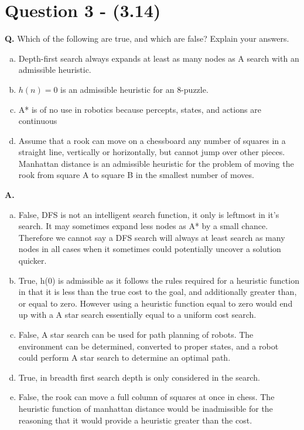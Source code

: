 \documentclass[12pt]{amsart}
\begin{document}
\section*{Question 3 - (3.14)}
\textbf{Q.} Which of the following are true, and which are false? Explain your answers.

\begin{enumerate}[a)]
  \item Depth-first search always expands at least as many nodes as A search with an admissible heuristic.
   \item $h(n) = 0 $ is an admissible heuristic for an 8-puzzle.
   \item A* is of no use in robotics because percepts, states, and actions are continuous
    \item Assume that a rook can move on a chessboard any number of squares in a straight line, vertically or horizontally, but cannot jump over other pieces. Manhattan distance is an admissible heuristic for the problem of moving the rook from square A to square B in the smallest number of moves.
\end{enumerate} \hfill \break

\textbf{A.}

\begin{enumerate}[a)]
\item False, DFS is not an intelligent search function, it only is leftmost in it's search. It may sometimes expand less nodes as A* by a small chance. Therefore we cannot say a DFS search will always at least search as many nodes in all cases when it sometimes could potentially uncover a solution quicker.
\item True, h(0) is admissible as it follows the rules required for a heuristic function in that it is less than the true cost to the goal, and additionally greater than, or equal to zero. However using a heuristic function equal to zero would end up with a A star search essentially equal to a uniform cost search.
\item False, A star search can be used for path planning of robots. The environment can be determined, converted to proper states, and a robot could perform A star search to determine an optimal path. 
\item True, in breadth first search depth is only considered in the search. 
\item False, the rook can move a full column of squares at once in chess. The heuristic function of manhattan distance would be inadmissible for the reasoning that it would provide a heuristic greater than the cost. 
\end{enumerate} \hfill \break
   
\end{document}
